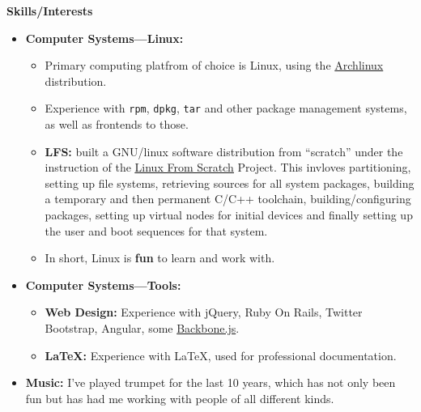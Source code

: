 \documentclass[11pt,oneside]{article}
\newenvironment{ressection}[1]{
	\vspace{4pt}
	{\textbf{\LARGE {\bigtxt #1}}}
	\begin{itemize}
	\vspace{2pt}
}{
	\end{itemize}
}
\newcommand{\resitem}[1]{
	\vspace{2.1pt}
	\item \begin{flushleft} #1 \end{flushleft}
}
\newcommand{\ressubitem}[1]{
	\vspace{-2pt}
	\item \begin{flushleft} #1 \end{flushleft}
}
\newenvironment{reslist}[1]{
	\resitem{\textbf{#1}}
	\vspace{0pt}
	\begin{itemize}
}{
	\end{itemize}
}
\begin{document}
\begin{ressection}{Skills/Interests}



    \begin{reslist}{Computer Systems---Linux:}
		\ressubitem{Primary computing platfrom of choice is Linux, using the 
		\href{http://www.archlinux.org/}{Archlinux} distribution.}

		\ressubitem{Experience with \texttt{rpm}, \texttt{dpkg}, \texttt{tar} 
		and other package management systems, as well as frontends to those.}

        \resitem{\textbf{LFS:} built a GNU/linux software distribution from 
		``scratch'' under the instruction of the 
		\href{http://www.linuxfromscratch.org/lfs}{\underline{Linux From 
		Scratch}} Project. This invloves partitioning, setting up file systems,
		retrieving sources for all system packages, building a temporary and 
		then permanent C/C++ toolchain, building/configuring packages, setting 
		up virtual nodes for initial devices and finally setting up the user and 
		boot sequences for that system.}

		\ressubitem{In short, Linux is \textbf{fun} to learn and work with.}
    \end{reslist}
    \begin{reslist}{\textbf{Computer Systems---Tools:}}
		\ressubitem{\textbf{Web Design:} Experience with jQuery, Ruby On Rails,
		Twitter Bootstrap, Angular, some \href{http://documentcloud.github.com/
		backbone/}{Backbone.js}.}
        \ressubitem{\textbf{\LaTeX{}:} Experience with \LaTeX{}, used for professional documentation.}
    \end{reslist}
    \resitem{\textbf{Music:} I've played trumpet for the last 10 years, which has not only been fun but has had me 
        working with people of all different kinds.}



\end{ressection}
\end{document}
